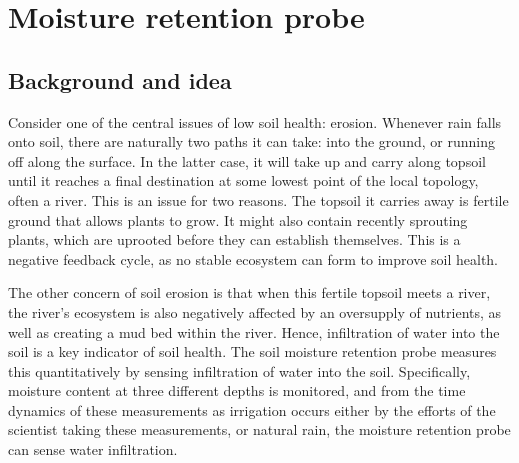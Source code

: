  
\clearpage
\section{Moisture retention probe}

\subsection{Background and idea}%
Consider one of the central issues of low soil health: erosion.\cite{soilvegetationsystemstrudgill1977} Whenever rain falls onto soil, there are naturally two paths it can take: into the ground, or running off along the surface. In the latter case, it will take up and carry along topsoil until it reaches a final destination at some lowest point of the local topology, often a river.\cite{unsaturatedsoilsresearchmancusoetal2012} This is an issue for two reasons. The topsoil it carries away is fertile ground that allows plants to grow. It might also contain recently sprouting plants, which are uprooted before they can establish themselves. This is a negative feedback cycle, as no stable ecosystem can form to improve soil health.

The other concern of soil erosion is that when this fertile topsoil meets a river, the river's ecosystem is also negatively affected by an oversupply of nutrients, as well as creating a mud bed within the river. Hence, infiltration of water into the soil is a key indicator of soil health.\cite{soilvegetationsystemstrudgill1977} The soil moisture retention probe measures this quantitatively by sensing infiltration of water into the soil. Specifically, moisture content at three different depths is monitored, and from the time dynamics of these measurements as irrigation occurs either by the efforts of the scientist taking these measurements, or natural rain, the moisture retention probe can sense water infiltration.

